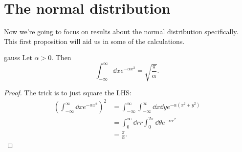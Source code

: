 \section{The normal distribution}
Now we're going to focus on results about the normal distribution specifically.
This first proposition will aid us in some of the calculations.

\begin{proposition}{}{gauss}
  Let $\alpha>0$. Then
  \begin{equation*}
    \int_{-\infty}^\infty\dd{x}e^{-\alpha x^2}=\sqrt{\frac{\pi}{\alpha}}.
  \end{equation*}
  \begin{proof}
    The trick is to just square the LHS:
    \begin{equation*}\begin{aligned}
      \left(\int_{-\infty}^\infty\dd{x}e^{-\alpha x^2}\right)^2
      &=\int_{-\infty}^\infty\int_{-\infty}^\infty\dd{x}\dd{y}
        e^{-\alpha(x^2+y^2)}\\
      &=\int_0^\infty \dd{r}r\int_0^{2\pi}\dd{\theta}e^{-\alpha r^2}\\
      &=\frac{\pi}{\alpha}.
    \end{aligned}\end{equation*}
  \end{proof}
\end{proposition}

